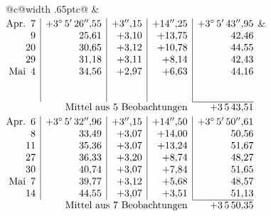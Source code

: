 \noindent\begin{tabular}{@{}c@{\hspace{.4em}\vrule width .65pt\hspace{.4em}}c@{}}
 &
 \\[.18ex]
\(\begin{array}[t]{@{}r|r|r|r|r@{}}
\text{Apr.}\enspace 7 & +3^\circ\,5'\,26''{,}55 & +3''{,}15 & +14''{,}25 & +3^\circ\,5'\,43''{,}95\\
9 & 25{,}61 & +3{,}10 & +13{,}75 & 42{,}46\\
20 & 30{,}65 & +3{,}12 & +10{,}78 & 44{,}55\\
29 & 31{,}18 & +3{,}11 & +8{,}14 & 42{,}43\\
\text{Mai}\enspace 4 & 34{,}56 & +2{,}97 & +6{,}63 & 44{,}16\\
 & & & & \\
 & & & & \\
\cline{5-5}
\multicolumn{4}{r}{\text{Mittel aus 5 Beobachtungen}} & +3\,5\,43{,}51
\end{array}\)
&
\(\begin{array}[t]{@{}r|r|r|r|r@{}}
\text{Apr.}\enspace 6 & +3^\circ\,5'\,32''{,}96 & +3''{,}15 & +14''{,}50 & +3^\circ\,5'\,50''{,}61\\
8 & 33{,}49 & +3{,}07 & +14{,}00 & 50{,}56\\
11 & 35{,}36 & +3{,}07 & +13{,}24 & 51{,}67\\
27 & 36{,}33 & +3{,}20 & +8{,}74 & 48{,}27\\
30 & 40{,}74 & +3{,}07 & +7{,}84 & 51{,}65\\
\text{Mai}\enspace 7 & 39{,}77 & +3{,}12 & +5{,}68 & 48{,}57\\
14 & 44{,}55 & +3{,}07 & +3{,}51 & 51{,}13\\
\cline{5-5}
\multicolumn{4}{r}{\text{Mittel aus 7 Beobachtungen}} & +3\,5\,50{,}35
\end{array}\)
\end{tabular}\par\medskip
